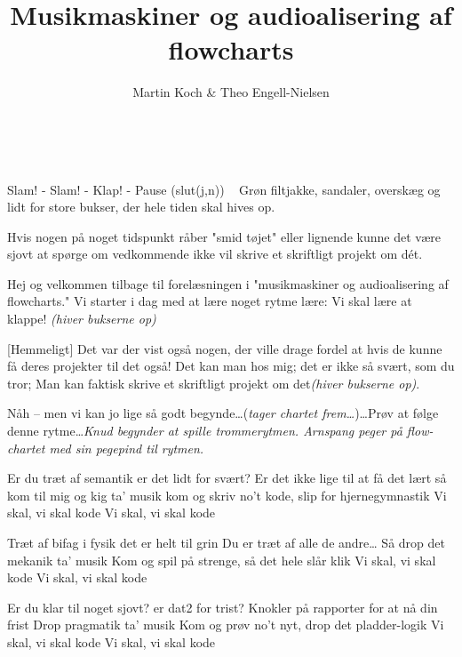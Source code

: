 \documentclass[10pt]{article}
\title{Musikmaskiner og audioalisering af flowcharts}
\author{Martin Koch \& Theo Engell-Nielsen}
\begin{document}
\maketitle

\begin{roles}
   ~
\end{roles}
\begin{props}
   Slam! - Slam! - Klap! - Pause (slut(j,n))
   ~
   Grøn filtjakke, sandaler, overskæg og lidt for store bukser,
  der hele tiden skal hives op.
\end{props}

\scene Hvis nogen på noget tidspunkt råber "smid tøjet" eller lignende kunne
det være sjovt at spørge om vedkommende ikke vil skrive et skriftligt
projekt om d\'et.

\begin{sketch}
   Hej og velkommen tilbage til forelæsningen i "musikmaskiner
  og audio\-alise\-ring af flow\-charts." Vi starter i dag med at lære
  noget rytme lære: Vi skal lære at klappe! {\em (hiver bukserne op)}

  [Hemmeligt] Det var der vist også nogen, der ville drage
  fordel at hvis de kunne få deres projekter til det også! Det kan man hos
  mig; det er ikke så svært, som du tror; Man kan faktisk skrive et
  skriftligt projekt om det{\em (hiver bukserne op)}.

   Nåh -- men vi kan jo lige så godt begynde\ldots ({\em tager
    chartet frem\ldots})\ldots Prøv at følge denne rytme\ldots {\em Knud
    begynder at spille trommerytmen. Arnspang peger på flow-chartet med sin
    pegepind til rytmen.}

\end{sketch}
\begin{song}
 Er du træt af semantik
er det lidt for svært?
Er det ikke lige til at få det lært
så kom til mig og kig
ta' musik
kom og skriv no't kode, slip for hjernegymnastik
Vi skal, vi skal kode
Vi skal, vi skal kode

Træt af bifag i fysik
det er helt til grin
Du er træt af alle de andre\ldots
Så drop det mekanik 
ta' musik
Kom og spil på strenge, så det hele slår klik
Vi skal, vi skal kode
Vi skal, vi skal kode

Er du klar til noget sjovt?
er dat2 for trist?
Knokler på rapporter for at nå din frist
Drop pragmatik
ta' musik
Kom og prøv no't nyt, drop det pladder-logik
Vi skal, vi skal kode
Vi skal, vi skal kode

\end{song}
\end{document}

